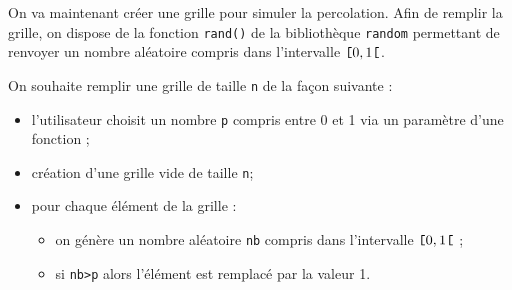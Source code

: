 %
%
%
%
%
%


On va maintenant créer une grille pour simuler la percolation. 
Afin de remplir la grille, on dispose de la fonction \texttt{rand()} de la bibliothèque \texttt{random} permettant de renvoyer un nombre aléatoire compris dans l'intervalle $\verb![!0,1\verb![!$.

On souhaite remplir une grille de taille \texttt{n} de la façon suivante : 
\begin{itemize}
\item l'utilisateur choisit un nombre \texttt{p} compris entre 0 et 1 via un paramètre d'une fonction ;
\item création d'une grille vide de taille \texttt{n};
\item pour chaque élément de la grille :
\begin{itemize}
\item on génère un nombre aléatoire \texttt{nb} compris dans l'intervalle $\verb![!0,1\verb![!$ ;
\item si \texttt{nb>p} alors l'élément est remplacé par la valeur 1. 
\end{itemize}
\end{itemize}


